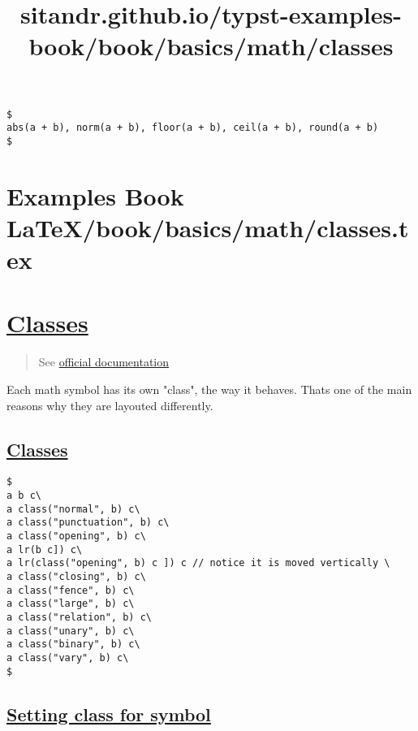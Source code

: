 \begin{verbatim}
$
abs(a + b), norm(a + b), floor(a + b), ceil(a + b), round(a + b)
$
\end{verbatim}

\pandocbounded{}


\section{Examples Book LaTeX/book/basics/math/classes.tex}
\title{sitandr.github.io/typst-examples-book/book/basics/math/classes}

\section{\texorpdfstring{\hyperref[classes]{Classes}}{Classes}}\label{classes}

\begin{quote}
See \href{https://typst.app/docs/reference/math/class/}{official
documentation}
\end{quote}

Each math symbol has its own "class", the way it behaves.
That\textquotesingle s one of the main reasons why they are layouted
differently.

\subsection{\texorpdfstring{\hyperref[classes-1]{Classes}}{Classes}}\label{classes-1}

\begin{verbatim}
$
a b c\
a class("normal", b) c\
a class("punctuation", b) c\
a class("opening", b) c\
a lr(b c]) c\
a lr(class("opening", b) c ]) c // notice it is moved vertically \
a class("closing", b) c\
a class("fence", b) c\
a class("large", b) c\
a class("relation", b) c\
a class("unary", b) c\
a class("binary", b) c\
a class("vary", b) c\
$
\end{verbatim}

\pandocbounded{}

\subsection{\texorpdfstring{\hyperref[setting-class-for-symbol]{Setting
class for
symbol}}{Setting class for symbol}}\label{setting-class-for-symbol}

